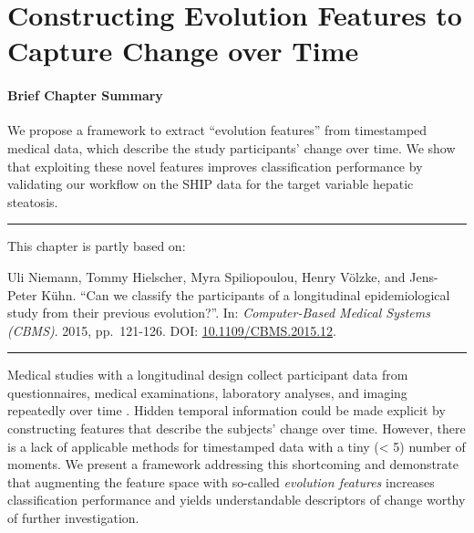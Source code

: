 \documentclass[
  oneside]{book}
\newenvironment{infobox}[1]
  {
  \begin{chapter-summary}
  }
  {
  \end{chapter-summary}
  }
\newenvironment{lit}
  {
  \vspace{8pt}
  \hrule
  \vspace{8pt}
  }
  {
  \vspace{8pt}
  \hrule
  \vspace{8pt}
  }
\begin{document}
\hypertarget{evo}{%
\chapter{Constructing Evolution Features to Capture Change over Time}\label{evo}}

\begin{infobox}{tasks.pdf}

\hypertarget{brief-chapter-summary-3}{%
\subsubsection*{Brief Chapter Summary}\label{brief-chapter-summary-3}}

We propose a framework to extract ``evolution features'' from timestamped medical data, which describe the study participants' change over time.
We show that exploiting these novel features improves classification performance by validating our workflow on the SHIP data for the target variable hepatic steatosis.

\end{infobox}

\begin{lit}

This chapter is partly based on:

Uli Niemann, Tommy Hielscher, Myra Spiliopoulou, Henry Völzke, and Jens-Peter Kühn. ``Can we classify the participants of a longitudinal epidemiological study from their previous evolution?''. In: \emph{Computer-Based Medical Systems (CBMS)}. 2015, pp.~121-126. DOI: \href{https://doi.org/10.1109\%2FCBMS.2015.12}{10.1109/CBMS.2015.12}.

\end{lit}

Medical studies with a longitudinal design collect participant data from questionnaires, medical examinations, laboratory analyses, and imaging repeatedly over time \autocite{Voelzke:SHIP11,who1988world,holle2005kora}.
Hidden temporal information could be made explicit by constructing features that describe the subjects' change over time.
However, there is a lack of applicable methods for timestamped data with a tiny (\textless{} 5) number of moments.
We present a framework addressing this shortcoming and demonstrate that augmenting the feature space with so-called \emph{evolution features} increases classification performance and yields understandable descriptors of change worthy of further investigation.
\end{document}
